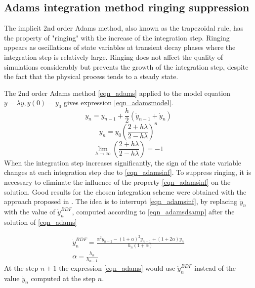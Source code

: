 \documentclass[lettersize,journal]{IEEEtran}
\begin{document}
\subsection{Adams integration method ringing suppression}

The implicit 2nd order Adams method, also known as the trapezoidal rule, has the property of "ringing" with the increase of the integration step. Ringing appears as oscillations of state variables at transient decay phases where the integration step is relatively large. Ringing does not affect the quality of simulations considerably but prevents the growth of the integration step, despite the fact that the physical process tends to a steady state.

The 2nd order Adams method \eqref{eqn_adams} applied to the model equation \(\dot{y}=\lambda y, y(0)=y_0\) gives expression \eqref{eqn_adamsmodel}.
\begin{equation}
	\label{eqn_adams}
	y_n=y_{n-1}+\frac{h}{2}\left(\dot{y}_{n-1}+\dot{y}_n\right)
\end{equation}
\begin{equation}
	\label{eqn_adamsmodel}
	y_n=y_0 \left( \frac{2+h\lambda }{2-h\lambda } \right)^n
\end{equation}
\begin{equation}
	\label{eqn_adamsinf}
	\lim_{h\rightarrow\infty}{ \left( \frac{2+h \lambda }{2-h \lambda } \right) } = -1
\end{equation}
When the integration step increases significantly, the sign of the state variable changes at each integration step due to \eqref{eqn_adamsinf}. To suppress ringing, it is necessary to eliminate the influence of the property \eqref{eqn_adamsinf} on the solution. Good results for the chosen integration scheme were obtained with the approach proposed in \cite{Lee2015}. The idea is to interrupt \eqref{eqn_adamsinf}, by replacing \(\dot{y}_n\) with the value of \(\dot{y}_n^{BDF}\), computed according to \eqref{eqn_adamsdsamp} after the solution of \eqref{eqn_adams}

\begin{equation}
	\label{eqn_adamsdsamp}
	\begin{array}{c}
	\dot{y}_n^{BDF}=\frac{\alpha^2y_{n-2}-(1+\alpha)^2y_{n-1}+(1+2\alpha)y_n}{h_n(1+\alpha)} \\
	\alpha=\frac{h_n}{h_{n-1}}
	\end{array}
\end{equation}
At the step \(n+1\) the expression \eqref{eqn_adams} would use \(\dot{y}_n^{BDF}\) instead of the value \(\dot{y}_n\) computed at the step \(n\).
\end{document}
